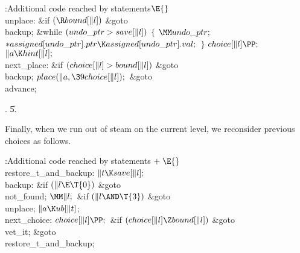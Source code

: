 \B{}:Additional code reached by 
statements\X${}\E{}$\6
\4\\{unplace}:\6
\&{if} ${}(\R\\{bound}[\|l]){}$\1\5
\&{goto} \\{backup};\2\6
\&{while} ${}(\\{undo\_ptr}>\\{save}[\|l]){}$\5
${}\{{}$\1\6
${}\MM\\{undo\_ptr};{}$\6
${}{*}\\{assigned}[\\{undo\_ptr}].\\{ptr}\K\\{assigned}[\\{undo\_ptr}].%
\\{val};{}$\6
\4${}\}{}$\2\6
${}\\{choice}[\|l]\PP;{}$\6
${}\|a\K\\{hint}[\|l];{}$\6
\4\\{next\_place}:\5
\&{if} ${}(\\{choice}[\|l]>\\{bound}[\|l]){}$\1\5
\&{goto} \\{backup};\2\6
${}\\{place}(\|a,\39\\{choice}[\|l]);{}$\6
\&{goto} \\{advance};\par
{}.
\U5.\fi

Finally, when we run out of steam on the current
level, we reconsider
previous choices as follows.

\fi

\B{}:Additional code reached by 
statements\X${}\mathrel+\E{}$\6
\4\\{restore\_t\_and\_backup}:\5
${}\|t\K\\{save}[\|l];{}$\6
\4\\{backup}:\6
\&{if} ${}(\|l\E\T{0}){}$\1\5
\&{goto} \\{not\_found};\2\6
${}\MM\|l;{}$\6
\&{if} ${}(\|l\AND\T{3}){}$\1\5
\&{goto} \\{unplace};\2\6
${}\|a\K\\{ub}[\|t]{}$;\6
\4\\{next\_choice}:\5
${}\\{choice}[\|l]\PP;{}$\6
\&{if} ${}(\\{choice}[\|l]\Z\\{bound}[\|l]){}$\1\5
\&{goto} \\{vet\_it};\2\6
\&{goto} \\{restore\_t\_and\_backup};\par
\fi

